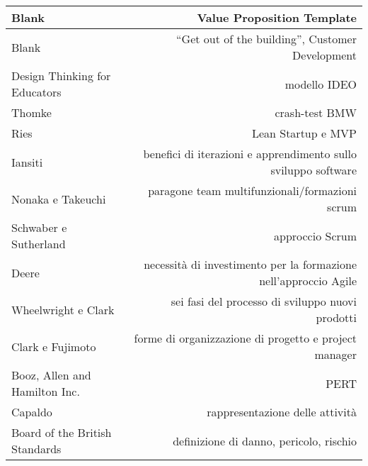 \documentclass[answers, a4paper, 11pt]{exam}
\begin{document}
\begin{table}[h!]
\begin{tabular}{|l|r|}
    \\ \hline Blank & Value Proposition Template
    \\ \hline Blank &  ``Get out of the building'', Customer Development
    \\ \hline Design Thinking for Educators & modello IDEO
    \\ \hline Thomke & crash-test BMW
    \\ \hline Ries & Lean Startup e MVP
    \\ \hline Iansiti & benefici di iterazioni e apprendimento sullo sviluppo software
    \\ \hline Nonaka e Takeuchi & paragone team multifunzionali/formazioni scrum
    \\ \hline Schwaber e Sutherland & approccio Scrum
    \\ \hline Deere & necessità di investimento per la formazione nell'approccio Agile
    \\ \hline Wheelwright e Clark & sei fasi del processo di sviluppo nuovi prodotti
    \\ \hline Clark e Fujimoto & forme di organizzazione di progetto e project manager
    \\ \hline Booz, Allen and Hamilton Inc. & PERT
    \\ \hline Capaldo & rappresentazione delle attività
    \\ \hline Board of the British Standards & definizione di danno, pericolo, rischio \\ \hline
\end{tabular}
\end{table}
\end{document}
